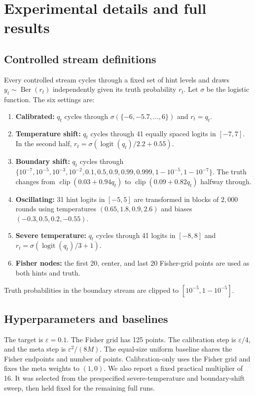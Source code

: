\documentclass{article}
\newcommand{\Ber}{\operatorname{Ber}}
\begin{document}
\section{Experimental details and full results}
\label{app:experiments}

\subsection{Controlled stream definitions}

Every controlled stream cycles through a fixed set of hint levels and draws $y_t\sim\Ber(r_t)$ independently given its truth probability $r_t$. Let $\sigma$ be the logistic function. The six settings are:
\begin{enumerate}
 \item \textbf{Calibrated:}
$q_t$ cycles through $\sigma(\{-6,-5.7,\ldots,6\})$ and $r_t=q_t$.
 \item \textbf{Temperature shift:}
$q_t$ cycles through 41 equally spaced logits in $[-7,7]$. In the second half, $r_t=\sigma(\operatorname{logit}(q_t)/2.2+0.55)$.
 \item \textbf{Boundary shift:}
$q_t$ cycles through $\{10^{-7},10^{-5},10^{-3},10^{-2},0.1,0.5,\allowbreak 0.9,0.99, 0.999,1-10^{-5},1-10^{-7}\}$. The truth changes from $\operatorname{clip}(0.03+0.94q_t)$ to $\operatorname{clip}(0.09+0.82q_t)$ halfway through.
 \item \textbf{Oscillating:}
31 hint logits in $[-5,5]$ are transformed in blocks of $2{,}000$ rounds using temperatures $(0.65,1.8,0.9,2.6)$ and biases $(-0.3,0.5,0.2,-0.55)$.
 \item \textbf{Severe temperature:}
$q_t$ cycles through 41 logits in $[-8,8]$ and $r_t=\sigma(\operatorname{logit}(q_t)/3+1)$.
 \item \textbf{Fisher nodes:}
the first 20, center, and last 20 Fisher-grid points are used as both hints and truth.
\end{enumerate}
Truth probabilities in the boundary stream are clipped to $[10^{-5},1-10^{-5}]$.

\subsection{Hyperparameters and baselines}

The target is $\varepsilon=0.1$. The Fisher grid has 125 points. The calibration step is $\varepsilon/4$, and the meta step is $\varepsilon^2/(8M)$. The equal-size uniform baseline shares the Fisher endpoints and number of points. Calibration-only uses the Fisher grid and fixes the meta weights to $(1,0)$. We also report a fixed practical multiplier of 16. It was selected from the prespecified severe-temperature and boundary-shift sweep, then held fixed for the remaining full runs.
\end{document}
